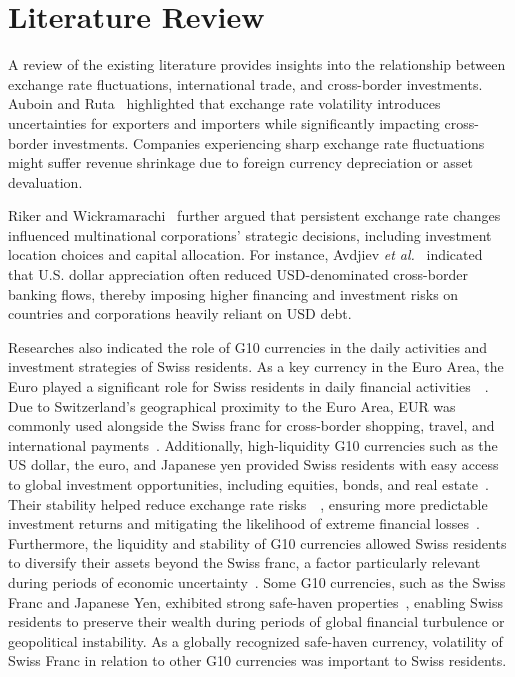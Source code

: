 \documentclass{article}
\begin{document}
\section{Literature Review}
A review of the existing literature provides insights into the relationship between exchange rate fluctuations, international trade, and cross-border investments. Auboin and Ruta~\cite{AUBOIN_RUTA_2013} highlighted that exchange rate volatility introduces uncertainties for exporters and importers while significantly impacting cross-border investments. Companies experiencing sharp exchange rate fluctuations might suffer revenue shrinkage due to foreign currency depreciation or asset devaluation.

Riker and Wickramarachi~\cite{riker2020review} further argued that persistent exchange rate changes influenced multinational corporations' strategic decisions, including investment location choices and capital allocation. For instance, Avdjiev \textit{et al.}~\cite{dollar_exchange} indicated that U.S. dollar appreciation often reduced USD-denominated cross-border banking flows, thereby imposing higher financing and investment risks on countries and corporations heavily reliant on USD debt.

Researches also indicated the role of G10 currencies in the daily activities and investment strategies of Swiss residents. As a key currency in the Euro Area, the Euro played a significant role for Swiss residents in daily financial activities~\cite{engel2016exchange}~\cite{goulferni2023switzerland}. Due to Switzerland's geographical proximity to the Euro Area, EUR was commonly used alongside the Swiss franc for cross-border shopping, travel, and international payments~\cite{sif_imf_reports}. Additionally, high-liquidity G10 currencies such as the US dollar, the euro, and Japanese yen provided Swiss residents with easy access to global investment opportunities, including equities, bonds, and real estate~\cite{rogoff2000six}. Their stability helped reduce exchange rate risks~\cite{campbell2002strategic}~\cite{engel2016exchange}, ensuring more predictable investment returns and mitigating the likelihood of extreme financial losses~\cite{de1998big}. Furthermore, the liquidity and stability of G10 currencies allowed Swiss residents to diversify their assets beyond the Swiss franc, a factor particularly relevant during periods of economic uncertainty~\cite{ito2020currency}. Some G10 currencies, such as the Swiss Franc and Japanese Yen, exhibited strong safe-haven properties~\cite{ranaldo2010safe}, enabling Swiss residents to preserve their wealth during periods of global financial turbulence or geopolitical instability. As a globally recognized safe-haven currency, volatility of Swiss Franc in relation to other G10 currencies was important to Swiss residents.
\end{document}
